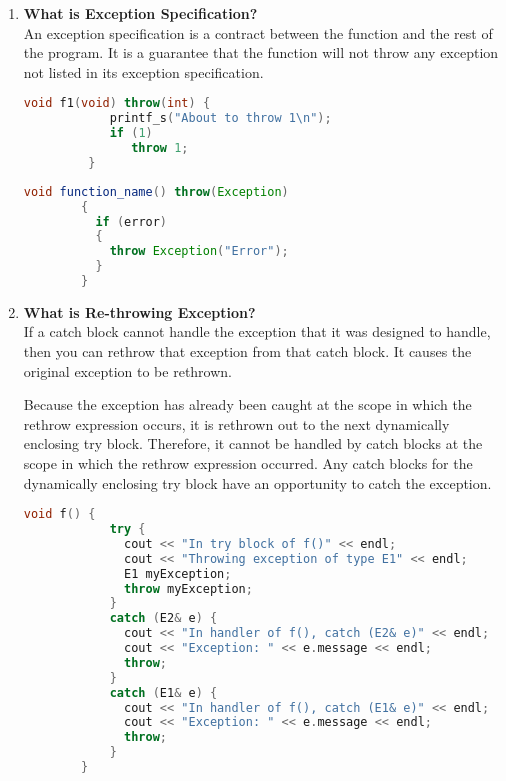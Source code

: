 \documentclass[11pt]{article}
\begin{document}
\begin{enumerate}
	      \textbf{Example}
	      \begin{lstlisting}[language=C++]
		int a;
		try
		{
			cin>> a;
			if(a == 0)
			{
				throw a; // int is being thrown. 
			}
			else{
				cout<<33/a; 
				throw 'a'; // character is being thrown.  
			}
		}
		catch (int a)
		{
			cout<<"cant divide by zero;
		}
		catch (char a)
		{
			cout<<"A is not zero";
		}
	\end{lstlisting}
	      \begin{lstlisting}[language = Java]
		try {
            withdrawal_amt = input.nextInt();
            if (withdrawal_amt > amount) {
                throw new Exception("Withdrawal amount more than amount. ");
				new_amount = withdrawal_amt / amount;
            } else {
                amount -= withdrawal_amt;
            }
        } catch (Exception e) {
            System.out.println("Withdrawal Amount more than amount in bank. ");
            return 0;
        } catch (DivisionByZeroException d)
		{
			System.out.println(d);
		}
	\end{lstlisting}
	\item \textbf{What is Exception Specification?}\\
	      An exception specification is a contract between the function and the rest of the program. It is a guarantee that the function will not throw any exception not listed in its exception specification.
	      \begin{lstlisting}[language = C++]
		void f1(void) throw(int) {   
			printf_s("About to throw 1\n");   
			if (1)   
			   throw 1;   
		 }   
	\end{lstlisting}
	      \begin{lstlisting}[language=Java]
		void function_name() throw(Exception)
		{
		  if (error) 
		  {
			throw Exception("Error");
		  }
		}		
	\end{lstlisting}
	\item \textbf{What is Re-throwing Exception?}\\
	      If a catch block cannot handle the exception that it was designed to handle, then you can rethrow that exception from that catch block.
	      It causes the original exception to be rethrown.

	      Because the exception has already been caught at the scope in which the rethrow expression occurs, it is rethrown out to the next dynamically enclosing try block. Therefore, it cannot be handled by catch blocks at the scope in which the rethrow expression occurred. Any catch blocks for the dynamically enclosing try block have an opportunity to catch the exception.
	      \begin{lstlisting}[language=C++]
		void f() {
			try {
			  cout << "In try block of f()" << endl;
			  cout << "Throwing exception of type E1" << endl;
			  E1 myException;
			  throw myException;
			}
			catch (E2& e) {
			  cout << "In handler of f(), catch (E2& e)" << endl;
			  cout << "Exception: " << e.message << endl;
			  throw;
			}
			catch (E1& e) {
			  cout << "In handler of f(), catch (E1& e)" << endl;
			  cout << "Exception: " << e.message << endl;
			  throw;
			}	
		}
		

\end{lstlisting}
\end{enumerate}
\end{document}
